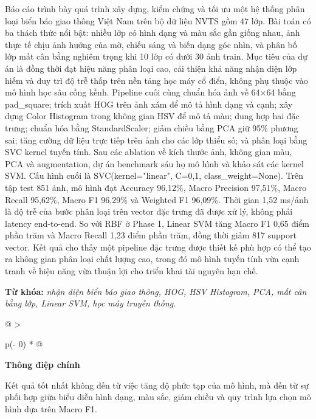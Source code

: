 \documentclass[12pt,a4paper]{article}
\begin{document}
Báo cáo trình bày quá trình xây dựng, kiểm chứng và tối ưu một hệ thống
phân loại biển báo giao thông Việt Nam trên bộ dữ liệu NVTS gồm 47 lớp.
Bài toán có ba thách thức nổi bật: nhiều lớp có hình dạng và màu sắc gần
giống nhau, ảnh thực tế chịu ảnh hưởng của mờ, chiếu sáng và biến dạng
góc nhìn, và phân bố lớp mất cân bằng nghiêm trọng khi 10 lớp có dưới 30
ảnh train. Mục tiêu của dự án là đồng thời đạt hiệu năng phân loại cao,
cải thiện khả năng nhận diện lớp hiếm và duy trì độ trễ thấp trên nền
tảng học máy cổ điển, không phụ thuộc vào mô hình học sâu cồng kềnh.
Pipeline cuối cùng chuẩn hóa ảnh về 64×64 bằng pad\_square; trích xuất
HOG trên ảnh xám để mô tả hình dạng và cạnh; xây dựng Color Histogram
trong không gian HSV để mô tả màu; dung hợp hai đặc trưng; chuẩn hóa
bằng StandardScaler; giảm chiều bằng PCA giữ 95\% phương sai; tăng cường
dữ liệu trực tiếp trên ảnh cho các lớp thiểu số; và phân loại bằng SVC
kernel tuyến tính. Sau các ablation về kích thước ảnh, không gian màu,
PCA và augmentation, dự án benchmark sáu họ mô hình và khảo sát các
kernel SVM. Cấu hình cuối là SVC(kernel="linear", C=0,1,
class\_weight=None). Trên tập test 851 ảnh, mô hình đạt Accuracy
96,12\%, Macro Precision 97,51\%, Macro Recall 95,62\%, Macro F1 96,29\%
và Weighted F1 96,09\%. Thời gian 1,52 ms/ảnh là độ trễ của bước phân
loại trên vector đặc trưng đã được xử lý, không phải latency end-to-end.
So với RBF ở Phase 1, Linear SVM tăng Macro F1 0,65 điểm phần trăm và
Macro Recall 1,23 điểm phần trăm, đồng thời giảm 817 support vector. Kết
quả cho thấy một pipeline đặc trưng được thiết kế phù hợp có thể tạo ra
không gian phân loại chất lượng cao, trong đó mô hình tuyến tính vừa
cạnh tranh về hiệu năng vừa thuận lợi cho triển khai tài nguyên hạn chế.

\textbf{Từ khóa:} \emph{nhận diện biển báo giao thông, HOG, HSV
Histogram, PCA, mất cân bằng lớp, Linear SVM, học máy truyền thống.}

\begin{longtable}[]{@{}
  >{\raggedright\arraybackslash}p{(\columnwidth - 0\tabcolsep) * }@{}}
\toprule\noalign{}
\begin{minipage}[b]{\linewidth}\raggedright
\textbf{Thông điệp chính}

Kết quả tốt nhất không đến từ việc tăng độ phức tạp của mô hình, mà đến
từ sự phối hợp giữa biểu diễn hình dạng, màu sắc, giảm chiều và quy
trình lựa chọn mô hình dựa trên Macro F1.
\end{minipage} \\
\midrule\noalign{}
\endhead
\bottomrule\noalign{}
\endlastfoot
\end{longtable}
\end{document}
